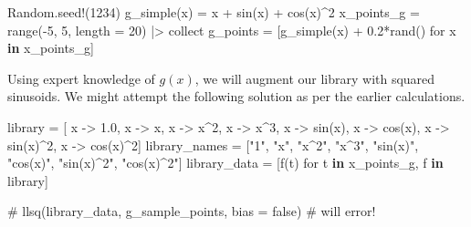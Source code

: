 \documentclass[
]{article}
\newenvironment{Shaded}{\begin{snugshade}}{\end{snugshade}}
\newcommand{\BuiltInTok}[1]{\textcolor[rgb]{0.00,0.23,0.31}{#1}}
\newcommand{\CommentTok}[1]{\textcolor[rgb]{0.37,0.37,0.37}{#1}}
\newcommand{\FloatTok}[1]{\textcolor[rgb]{0.68,0.00,0.00}{#1}}
\newcommand{\FunctionTok}[1]{\textcolor[rgb]{0.28,0.35,0.67}{#1}}
\newcommand{\KeywordTok}[1]{\textcolor[rgb]{0.00,0.23,0.31}{\textbf{#1}}}
\newcommand{\NormalTok}[1]{\textcolor[rgb]{0.00,0.23,0.31}{#1}}
\newcommand{\OperatorTok}[1]{\textcolor[rgb]{0.37,0.37,0.37}{#1}}
\newcommand{\StringTok}[1]{\textcolor[rgb]{0.13,0.47,0.30}{#1}}
\begin{document}
\begin{Shaded}
\begin{Highlighting}[]
\BuiltInTok{Random}\NormalTok{.}\FunctionTok{seed!}\NormalTok{(}\FloatTok{1234}\NormalTok{)}
\FunctionTok{g\_simple}\NormalTok{(x) }\OperatorTok{=}\NormalTok{ x }\OperatorTok{+} \FunctionTok{sin}\NormalTok{(x) }\OperatorTok{+} \FunctionTok{cos}\NormalTok{(x)}\OperatorTok{\^{}}\FloatTok{2}
\NormalTok{x\_points\_g }\OperatorTok{=} \FunctionTok{range}\NormalTok{(}\OperatorTok{{-}}\FloatTok{5}\NormalTok{, }\FloatTok{5}\NormalTok{, length }\OperatorTok{=} \FloatTok{20}\NormalTok{) }\OperatorTok{|\textgreater{}}\NormalTok{ collect}
\NormalTok{g\_points }\OperatorTok{=}\NormalTok{ [}\FunctionTok{g\_simple}\NormalTok{(x) }\OperatorTok{+} \FloatTok{0.2}\FunctionTok{*rand}\NormalTok{() for x }\KeywordTok{in}\NormalTok{ x\_points\_g]}
\end{Highlighting}
\end{Shaded}

Using expert knowledge of \(g(x)\), we will augment our library with
squared sinusoids. We might attempt the following solution as per the
earlier calculations.

\begin{Shaded}
\begin{Highlighting}[]
\NormalTok{library }\OperatorTok{=}\NormalTok{ [}
\NormalTok{  x }\OperatorTok{{-}\textgreater{}} \FloatTok{1.0}\NormalTok{, x }\OperatorTok{{-}\textgreater{}}\NormalTok{ x, x }\OperatorTok{{-}\textgreater{}}\NormalTok{ x}\OperatorTok{\^{}}\FloatTok{2}\NormalTok{, x }\OperatorTok{{-}\textgreater{}}\NormalTok{ x}\OperatorTok{\^{}}\FloatTok{3}\NormalTok{, }
\NormalTok{  x }\OperatorTok{{-}\textgreater{}} \FunctionTok{sin}\NormalTok{(x), x }\OperatorTok{{-}\textgreater{}} \FunctionTok{cos}\NormalTok{(x), }
\NormalTok{  x }\OperatorTok{{-}\textgreater{}} \FunctionTok{sin}\NormalTok{(x)}\OperatorTok{\^{}}\FloatTok{2}\NormalTok{, x }\OperatorTok{{-}\textgreater{}} \FunctionTok{cos}\NormalTok{(x)}\OperatorTok{\^{}}\FloatTok{2}\NormalTok{]}
\NormalTok{library\_names }\OperatorTok{=}\NormalTok{ [}\StringTok{"1"}\NormalTok{, }\StringTok{"x"}\NormalTok{, }\StringTok{"x\^{}2"}\NormalTok{, }\StringTok{"x\^{}3"}\NormalTok{, }\StringTok{"sin(x)"}\NormalTok{, }\StringTok{"cos(x)"}\NormalTok{, }\StringTok{"sin(x)\^{}2"}\NormalTok{, }\StringTok{"cos(x)\^{}2"}\NormalTok{]}
\NormalTok{library\_data }\OperatorTok{=}\NormalTok{ [}\FunctionTok{f}\NormalTok{(t) for t }\KeywordTok{in}\NormalTok{ x\_points\_g, f }\KeywordTok{in}\NormalTok{ library]}

\CommentTok{\# llsq(library\_data, g\_sample\_points, bias = false) \# will error!}
\end{Highlighting}
\end{Shaded}
\end{document}
